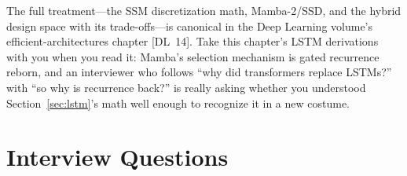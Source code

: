 The full treatment---the SSM discretization math, Mamba-2/SSD, and the
hybrid design space with its trade-offs---is canonical in the Deep
Learning volume's efficient-architectures chapter [DL~14].  Take this
chapter's LSTM derivations with you when you read it: Mamba's selection
mechanism is gated recurrence reborn, and an interviewer who follows ``why
did transformers replace LSTMs?'' with ``so why is recurrence back?'' is
really asking whether you understood Section~\ref{sec:lstm}'s math well
enough to recognize it in a new costume.


\section{Interview Questions}
\label{sec:neural_seq_interview}

